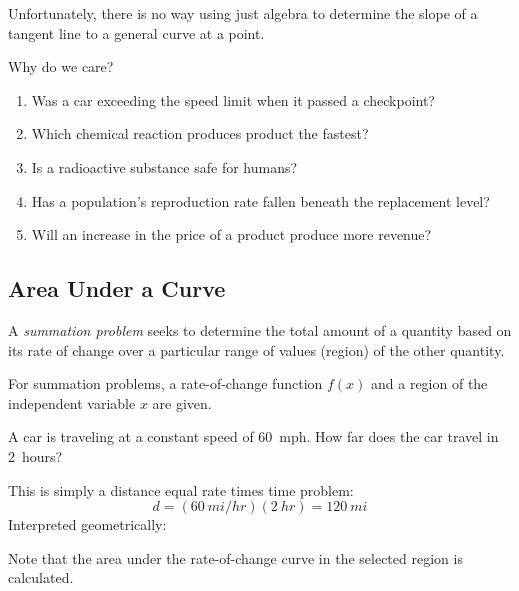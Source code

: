 \documentclass[letterpaper,12pt,fleqn]{article}
\begin{document}
Unfortunately, there is no way using just algebra to determine the slope of a tangent line to a general curve at a
point.

Why do we care?
\begin{enumerate}
\item Was a car exceeding the speed limit when it passed a checkpoint?
\item Which chemical reaction produces product the fastest?
\item Is a radioactive substance safe for humans?
\item Has a population's reproduction rate fallen beneath the replacement level?
\item Will an increase in the price of a product produce more revenue?
\end{enumerate}

\subsection*{Area Under a Curve}

\begin{definition}
  A \emph{summation problem} seeks to determine the total amount of a quantity based on its rate of change over
  a particular range of values (region) of the other quantity.
\end{definition}

For summation problems, a rate-of-change function \(f(x)\) and a region of the independent variable \(x\) are
given.

\begin{example}
  A car is traveling at a constant speed of \SI{60}{mph}.  How far does the car travel in \SI{2}{hours}?

  This is simply a distance equal rate times time problem:
  \[d=(\SI{60}{mi/hr})(\SI{2}{hr})=\SI{120}{mi}\]
  Interpreted geometrically:

  \bigskip

  \begin{center}
  \end{center}

  \bigskip

  Note that the area under the rate-of-change curve in the selected region is calculated.
\end{example}
\end{document}
